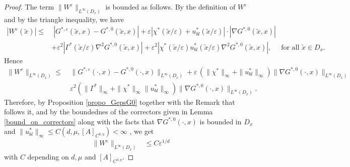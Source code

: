 \documentclass[11pt, reqno]{amsart}
\theoremstyle{definition}
\theoremstyle{remark}
\numberwithin{equation}{section}
\begin{document}
	\begin{proof}[Proof]
		The term  $\| W^{\varepsilon}\|_{L^\infty(D_x)}$  is bounded as follows. By the definition of $W^{\varepsilon}$ and by the triangle inequality, we have
		\begin{align*}
			| W^{\varepsilon} (\tilde{x})|\leq& \;|G^{*,\varepsilon} (\tilde{x},x)-G^{*,0} (\tilde{x},x)|+ \varepsilon |\chi^*(\tilde{x}/\varepsilon) + u_{bl}^*(\tilde{x}/\varepsilon)|\cdot|\nabla G^{*,0}(\tilde{x},x)|\\
			&+\varepsilon^2 |\Gamma^*(\tilde{x}/\varepsilon) \nabla^2 G^{*,0} (\tilde{x},x)|+\varepsilon^2 |\chi^* (\tilde{x}/\varepsilon)u_{bl}^*(\tilde{x}/\varepsilon) \nabla^2 G^{*,0} (\tilde{x},x)|, \quad \mbox{ for all } \tilde{x}\in D_x.
		\end{align*}
		Hence 
		\begin{align*}
			\| W^{\varepsilon} \|_{L^\infty(D_x)}\leq \:&   \|G^{*,\varepsilon} (\cdot,x)-G^{*,0} (\cdot,x)\|_{L^\infty(D_x)}+ \varepsilon \, (\|\chi^*\|_\infty + \|u^*_{bl}\|_\infty) \|\nabla G^{*,0}(\cdot,x)\|_{L^\infty(D_x)} \\
			&\varepsilon^2 \left(\|\Gamma ^*\|_\infty   + \|\chi^*\|_\infty  \|u_{bl}^*\|_\infty\right) \|\nabla G^{*,0}(\cdot,x)\|_{L^\infty(D_x)}. 
		\end{align*}
		Therefore, by Proposition \ref{propo_GepsG0} together with the Remark that follows it, and by the boundednes of the correctors given in Lemma \ref{bound_on_correctors} along with the facts  that $ \nabla G^{*,0}(\cdot,x)$ is bounded in $D_x$ and  $ \|u_{bl}^*\|_\infty \leq C(d, \mu, [A]_{C^{0,\eta}})<\infty$ , we get
		\begin{align*}
			\| W^{\varepsilon} \|_{L^\infty(D_x)}&\leq C\varepsilon^{1/d} 
		\end{align*}
		with $C$ depending  on $d, \mu$ and $[A]_{C^{0,\eta}}$.
	\end{proof}
	
\end{document}
